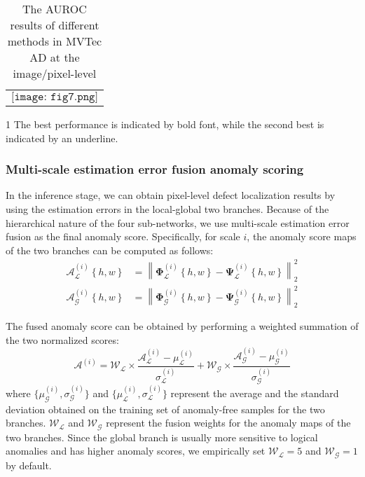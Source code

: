 \documentclass[lettersize,journal]{IEEEtran}
\begin{document}
\begin{table*}
\caption{{The AUROC results of different methods in MVTec AD at the image/pixel-level}}
\label{table}
\setlength{\tabcolsep}{3pt}
\begin{threeparttable}
\begin{tabular}{p{\textwidth}}
$\texttt{[image: fig7.png]}$
\end{tabular}
\begin{tablenotes}
       \footnotesize
       \item[1]The best performance is indicated by bold font, while the second best is indicated by an underline.
\end{tablenotes}
\end{threeparttable}
\label{table4}
\end{table*}
\subsubsection{Multi-scale estimation error fusion anomaly scoring}

In the inference stage, we can obtain pixel-level defect localization results by using the estimation errors in the local-global two branches. Because of the hierarchical nature of the four sub-networks, we use multi-scale estimation error fusion as the final anomaly score. Specifically, for scale $i$, the anomaly score maps of the two branches can be computed as follows:
\begin{equation}
\begin{aligned}
  \mathcal{A}_{\mathcal{L}}^{(i)}\left \{ h,w\right \} & = \left \| \mathbf{\Phi}_{\mathcal{L}}^{(i)}\left \{ h,w\right \}-\mathbf{\Psi }_{\mathcal{L}}^{(i)}\left \{ h,w\right \} \right \|_{2}^{2}  \\  
  \mathcal{A}_{\mathcal{G}}^{(i)}\left \{ h,w\right \} & = \left \| \mathbf{\Phi}_{\mathcal{G}}^{(i)}\left \{ h,w\right \}-\mathbf{\Psi }_{\mathcal{G}}^{(i)}\left \{ h,w\right \} \right \|_{2}^{2} 
\end{aligned}
\label{eq1}
\end{equation}

The fused anomaly score can be obtained by performing a weighted summation of the two normalized scores:
\begin{equation}
\mathcal{A}^{(i)}=\mathcal{W}_{\mathcal{L}}\times  \frac{\mathcal{A}_{\mathcal{L}}^{(i)}-\mu_{\mathcal{L}}^{(i)}}{\sigma_{\mathcal{L}}^{(i)}} +\mathcal{W}_{\mathcal{G}}\times  \frac{\mathcal{A}_{\mathcal{G}}^{(i)}-\mu_{\mathcal{G}}^{(i)}}{\sigma_{\mathcal{G}}^{(i)}}
\end{equation}
where $\big \{ \mu_{\mathcal{G}}^{(i)},\sigma_{\mathcal{G}}^{(i)} \big \}$ and $\big \{ \mu_{\mathcal{L}}^{(i)},\sigma_{\mathcal{L}}^{(i)} \big \}$ represent the average and the standard deviation obtained on the training set of anomaly-free samples for the two branches. $\mathcal{W}_{\mathcal{L}}$ and $\mathcal{W}_{\mathcal{G}}$ represent the fusion weights for the anomaly maps of the two branches. Since the global branch is usually more sensitive to logical anomalies and has higher anomaly scores, we empirically set $\mathcal{W}_{\mathcal{L}}=5$ and $\mathcal{W}_{\mathcal{G}}=1$ by default.
\end{document}
